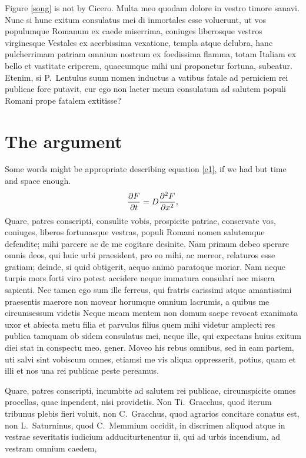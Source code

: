 \documentclass[letterpaper]{ifacmtg}
\begin{document}
Figure \ref{song} is not by Cicero.
Multa meo quodam dolore in vestro timore sanavi. Nunc si hunc exitum
consulatus mei di inmortales esse voluerunt, ut vos populumque Romanum
ex caede miserrima, coniuges liberosque vestros virginesque Vestales ex
acerbissima vexatione, templa atque delubra, hanc pulcherrimam patriam
omnium nostrum ex foedissima flamma, totam Italiam ex bello et vastitate
eriperem, quaecumque mihi uni proponetur fortuna, subeatur. Etenim, si
P.~Lentulus suum nomen inductus a vatibus fatale ad perniciem rei
publicae fore putavit, cur ego non laeter meum consulatum ad salutem
populi Romani prope fatalem extitisse?


\section{The argument}
Some words might be appropriate describing equation \ref{e1}, if we
had but time and space enough.
\begin{equation}
{{\partial F}\over {\partial
t}}=D{{\partial^2 F}\over {\partial x^2}},
\label{e1}
\end{equation}
Quare, patres conscripti, consulite vobis, prospicite patriae,
conservate vos, coniuges, liberos fortunasque vestras, populi Romani
nomen salutemque defendite; mihi parcere ac de me cogitare desinite. Nam
primum debeo sperare omnis deos, qui huic urbi praesident, pro eo mihi,
ac mereor, relaturos esse gratiam; deinde, si quid obtigerit, aequo
animo paratoque moriar. Nam neque turpis mors forti viro potest accidere
neque immatura consulari nec misera sapienti. Nec tamen ego sum ille
ferreus, qui fratris carissimi atque amantissimi praesentis maerore non
movear horumque omnium lacrumis, a quibus me circumsessum videtis Neque
meam mentem non domum saepe revocat exanimata uxor et abiecta metu filia
et parvulus filius quem mihi videtur amplecti res publica tamquam ob
sidem consulatus mei, neque ille, qui expectans huius exitum diei stat
in conspectu meo, gener. Moveo his rebus omnibus, sed in eam partem, uti
salvi sint vobiscum omnes, etiamsi me vis aliqua oppresserit, potius,
quam et illi et nos una rei publicae peste pereamus. \par Quare, patres
conscripti, incumbite ad salutem rei publicae, circumspicite omnes
procellas, quae inpendent, nisi providetis. Non Ti.~Gracchus, quod
iterum tribunus plebis fieri voluit, non C.~Gracchus, quod agrarios
concitare conatus est, non L.~Saturninus, quod C.~Memmium occidit, in
discrimen aliquod atque in vestrae severitatis iudicium
adduciturtenentur ii, qui ad urbis incendium, ad vestram omnium caedem,
\end{document}

